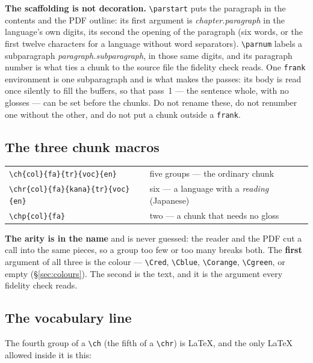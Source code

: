 \documentclass[11pt,oneside]{report}
\begin{document}
\textbf{The scaffolding is not decoration.} \verb|\parstart| puts the
paragraph in the contents and the PDF outline: its first argument is
\emph{chapter.paragraph} in the language's own digits, its second the opening
of the paragraph (six words, or the first twelve characters for a language
without word separators). \verb|\parnum| labels a subparagraph
\emph{paragraph.subparagraph}, in those same digits, and its paragraph number
is what ties a chunk to the source file the fidelity check reads. One
\texttt{frank} environment is one subparagraph and is what makes the passes:
its body is read once silently to fill the buffers, so that pass~1 --- the
sentence whole, with no glosses --- can be set before the chunks. Do not
rename these, do not renumber one without the other, and do not put a chunk
outside a \texttt{frank}.

\subsection*{The three chunk macros}

\begin{center}
\begin{tabular}{@{}ll@{}}
\toprule
\verb|\ch{col}{fa}{tr}{voc}{en}| & five groups --- the ordinary chunk \\
\verb|\chr{col}{fa}{kana}{tr}{voc}{en}| & six --- a language with a
  \emph{reading} (Japanese) \\
\verb|\chp{col}{fa}| & two --- a chunk that needs no gloss \\
\bottomrule
\end{tabular}
\end{center}

\noindent \textbf{The arity is in the name} and is never guessed: the reader
and the PDF cut a call into the same pieces, so a group too few or too many
breaks both. The \textbf{first} argument of all three is the colour ---
\verb|\Cred|, \verb|\Cblue|, \verb|\Corange|, \verb|\Cgreen|, or empty
(\S\ref{sec:colours}). The second is the text, and it is the argument every
fidelity check reads.

\subsection*{The vocabulary line}

The fourth group of a \verb|\ch| (the fifth of a \verb|\chr|) is LaTeX, and
the only LaTeX allowed inside it is this:
\end{document}
